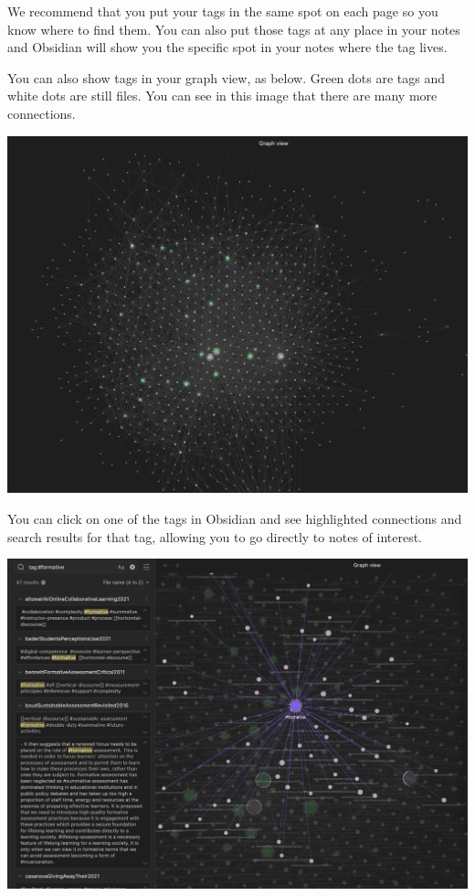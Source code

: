 \documentclass[
]{book}
\theoremstyle{definition}
\theoremstyle{definition}
\theoremstyle{definition}
\theoremstyle{definition}
\theoremstyle{remark}
\begin{document}
We recommend that you put your tags in the same spot on each page so you know where to find them. You can also put those tags at any place in your notes and Obsidian will show you the specific spot in your notes where the tag lives.

You can also show tags in your graph view, as below. Green dots are tags and white dots are still files. You can see in this image that there are many more connections.

\includegraphics{assets/u3/graph1.png}

You can click on one of the tags in Obsidian and see highlighted connections and search results for that tag, allowing you to go directly to notes of interest.

\includegraphics{assets/u3/graph3.png}
\end{document}

